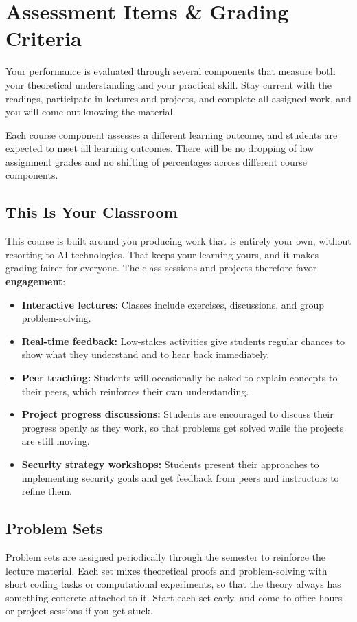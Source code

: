 \documentclass[10pt,a4paper,american]{exam}
\begin{document}
\section{Assessment Items \& Grading Criteria}
Your performance is evaluated through several components that measure both your theoretical understanding and your practical skill. Stay current with the readings, participate in lectures and projects, and complete all assigned work, and you will come out knowing the material.

Each course component assesses a different learning outcome, and students are expected to meet all learning outcomes. There will be no dropping of low assignment grades and no shifting of percentages across different course components.

\subsection{This Is Your Classroom}
This course is built around you producing work that is entirely your own, without resorting to AI technologies. That keeps your learning yours, and it makes grading fairer for everyone. The class sessions and projects therefore favor \textbf{engagement}:

\begin{itemize}
	\item \textbf{Interactive lectures:} Classes include exercises, discussions, and group problem-solving.
	\item \textbf{Real-time feedback:} Low-stakes activities give students regular chances to show what they understand and to hear back immediately.
	\item \textbf{Peer teaching:} Students will occasionally be asked to explain concepts to their peers, which reinforces their own understanding.
	\item \textbf{Project progress discussions:} Students are encouraged to discuss their progress openly as they work, so that problems get solved while the projects are still moving.
	\item \textbf{Security strategy workshops:} Students present their approaches to implementing security goals and get feedback from peers and instructors to refine them.
\end{itemize}

\subsection{Problem Sets}
Problem sets are assigned periodically through the semester to reinforce the lecture material. Each set mixes theoretical proofs and problem-solving with short coding tasks or computational experiments, so that the theory always has something concrete attached to it. Start each set early, and come to office hours or project sessions if you get stuck.
\end{document}
